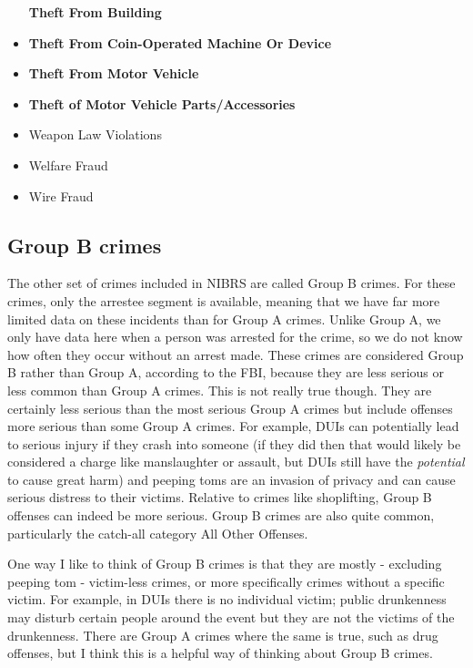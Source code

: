 \documentclass[
]{krantz}
\begin{document}
\begin{itemize}
  \textbf{Theft From Building}\\
\item
  \textbf{Theft From Coin-Operated Machine Or Device}\\
\item
  \textbf{Theft From Motor Vehicle}\\
\item
  \textbf{Theft of Motor Vehicle Parts/Accessories}\\
\item
  Weapon Law Violations\\
\item
  Welfare Fraud\\
\item
  Wire Fraud
\end{itemize}

\subsection{Group B crimes}\label{group-b-crimes}

The other set of crimes included in NIBRS are called Group B
crimes. For these crimes, only the arrestee segment is
available, meaning that we have far more limited data on
these incidents than for Group A crimes. Unlike Group A, we
only have data here when a person was arrested for the
crime, so we do not know how often they occur without an
arrest made. These crimes are considered Group B rather than
Group A, according to the FBI, because they are less serious
or less common than Group A crimes. This is not really true
though. They are certainly less serious than the most
serious Group A crimes but include offenses more serious
than some Group A crimes. For example, DUIs can potentially
lead to serious injury if they crash into someone (if they
did then that would likely be considered a charge like
manslaughter or assault, but DUIs still have the
\emph{potential} to cause great harm) and peeping toms are
an invasion of privacy and can cause serious distress to
their victims. Relative to crimes like shoplifting, Group B
offenses can indeed be more serious. Group B crimes are also
quite common, particularly the catch-all category All Other
Offenses.

One way I like to think of Group B crimes is that they are
mostly - excluding peeping tom - victim-less crimes, or more
specifically crimes without a specific victim. For example,
in DUIs there is no individual victim; public drunkenness
may disturb certain people around the event but they are not
the victims of the drunkenness. There are Group A crimes
where the same is true, such as drug offenses, but I think
this is a helpful way of thinking about Group B crimes.
\end{document}
